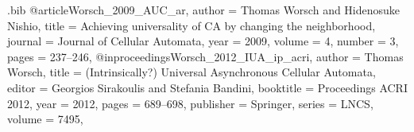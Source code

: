 \begin{filecontents*}{\jobname.bib}
@article{Worsch_2009_AUC_ar,
  author  = {Thomas Worsch and Hidenosuke Nishio},
  title   = {Achieving universality of {CA} by changing the neighborhood},
  journal = {Journal of Cellular Automata},
  year    = {2009},
  volume  = {4},
  number  = {3},
  pages   = {237--246},
}
@inproceedings{Worsch_2012_IUA_ip_acri,
  author    = {Thomas Worsch},
  title     = {({I}ntrinsically?) Universal Asynchronous Cellular Automata},
  editor    = {Georgios Sirakoulis and Stefania Bandini},
  booktitle = {Proceedings ACRI 2012},
  year      = {2012},
  pages     = {689--698},
  publisher = {Springer},
  series    = {LNCS},
  volume    = {7495},
}
\end{filecontents*}

\documentclass[11pt,a4paper]{article}

\usepackage[T1]{fontenc}
\usepackage[ngerman]{babel}
\usepackage[utf8]{inputenc}

\usepackage{amsmath}

\usepackage[tt=false]{libertine}   %
\usepackage[libertine]{newtxmath}  %

%
%
\usepackage{csquotes}

\usepackage{microtype}

\usepackage{fancyvrb}

\usepackage{graphicx}

\usepackage{booktabs}
\usepackage[shortlabels]{enumitem}

\usepackage{titlesec}
\usepackage{tcolorbox}

\usepackage{bbold}
\newcommand{\Z}{\mathbb{Z}}

\usepackage{hologo}


\usepackage{tikz}

\newcommand{\teilnehmername}{Klaus Philipp Theyssen} %
\newcommand{\teilnehmermatrnr}{2061578}        %
\newcommand{\seminarart}{Proseminar}           %
\newcommand{\seminarlp}{3 LP}                  %
\newcommand{\seminarjahr}{2019}                %
\newcommand{\meta}[1]{$\langle$\textit{#1}$\rangle$}
\newcommand{\paket}[1]{\texttt{#1}}
\newcommand{\prgname}[1]{\texttt{#1}}

